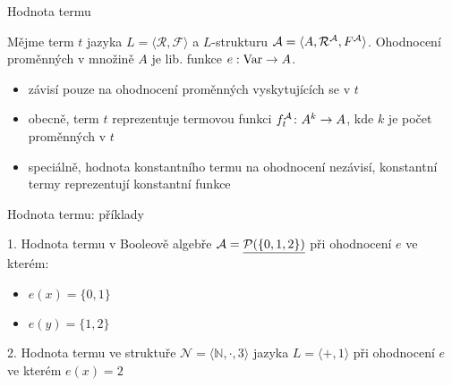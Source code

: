 \documentclass{beamer}
\begin{document}
\begin{frame}{Hodnota termu}

    Mějme term $t$ jazyka $L=\langle \mathcal R,\mathcal F\rangle$ a $L$-strukturu $\mathcal{A}=\langle A,\mathcal R^{\mathcal{A}},F^{\mathcal{A}}\rangle$. \alert{Ohodnocení proměnných} v množině $A$ je lib. funkce $e:\operatorname{Var}\to A$.
    

    \begin{itemize}
        \item závisí pouze na ohodnocení proměnných vyskytujících se v $t$
        \item obecně, term $t$ reprezentuje \alert{termovou funkci} $f_t^{\mathcal{A}}\colon A^k\to A$, kde $k$ je počet proměnných v $t$
        \item speciálně, hodnota konstantního termu na ohodnocení nezávisí, konstantní termy reprezentují konstantní funkce
    \end{itemize}
    
\end{frame}


\begin{frame}{Hodnota termu: příklady}
    
    1. Hodnota termu  v Booleově algebře $\mathcal{A}=\underline{\mathcal P(\{0,1,2\})}$ při ohodnocení $e$ ve kterém:
        \begin{itemize}
            \item $e(x)=\{0,1\}$
            \item $e(y)=\{1,2\}$
        \end{itemize}
  
    
    \bigskip\bigskip

    2. Hodnota termu  ve struktuře $\mathcal N=\langle\mathbb N,\cdot,3\rangle$ jazyka $L=\langle +,1\rangle$ při ohodnocení $e$ ve kterém $e(x)=2$ 

    
\end{frame}
\end{document}
